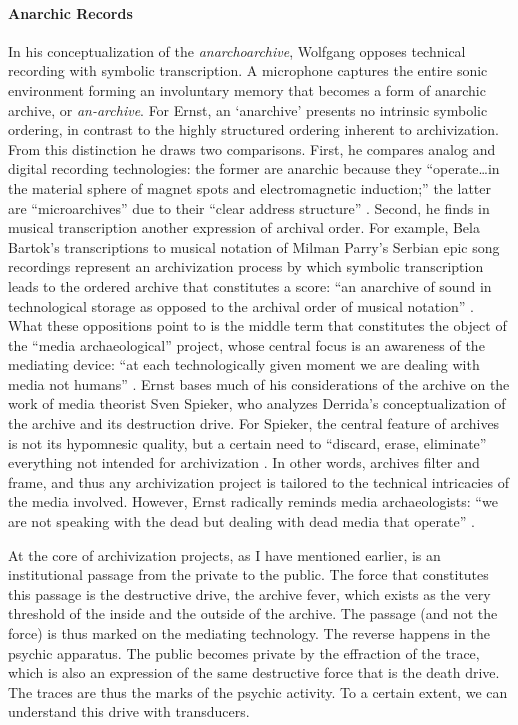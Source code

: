 
\paragraph{Anarchic Records}
In his conceptualization of the \textit{anarchoarchive}, Wolfgang \textcite{Ern13:Dig} opposes technical recording with symbolic transcription. A microphone captures the entire sonic environment forming an involuntary memory that becomes a form of anarchic archive, or \textit{an-archive}. For Ernst, an `anarchive' presents no intrinsic symbolic ordering, in contrast to the highly structured ordering inherent to archivization. From this distinction he draws two comparisons. First, he compares analog and digital recording technologies: the former are anarchic because they ``operate\dots in the material sphere of magnet spots and electromagnetic induction;'' the latter are ``microarchives'' due to their ``clear address structure'' \textcite[92]{Ern13:Dig}. Second, he finds in musical transcription another expression of archival order. For example, Bela Bartok's transcriptions to musical notation of Milman Parry's Serbian epic song recordings represent an archivization process by which symbolic transcription leads to the ordered archive that constitutes a score: ``an anarchive of sound in technological storage as opposed to the archival order of musical notation'' \parencite[174]{Ern13:Dig}. What these oppositions point to is the middle term that constitutes the object of the ``media archaeological'' project, whose central focus is an awareness of the mediating device: ``at each technologically given moment we are dealing with media not humans'' \parencite[183]{Ern13:Dig}. Ernst bases much of his considerations of the archive on the work of media theorist Sven Spieker, who analyzes Derrida's conceptualization of the archive and its destruction drive. For Spieker, the central feature of archives is not its hypomnesic quality, but a certain need to ``discard, erase, eliminate'' everything not intended for archivization \parencite[113]{Ern13:Dig}. In other words, archives filter and frame, and thus any archivization project is tailored to the technical intricacies of the media involved. However, Ernst radically reminds media archaeologists: ``we are not speaking with the dead but dealing with dead media that operate'' \parencite[183]{Ern13:Dig}.   

At the core of archivization projects, as I have mentioned earlier, is an institutional passage from the private to the public. The force that constitutes this passage is the destructive drive, the archive fever, which exists as the very threshold of the inside and the outside of the archive. The passage (and not the force) is thus marked on the mediating technology. The reverse happens in the psychic apparatus. The public becomes private by the effraction of the trace, which is also an expression of the same destructive force that is the death drive. The traces are thus the marks of the psychic activity. To a certain extent, we can understand this drive with transducers.

